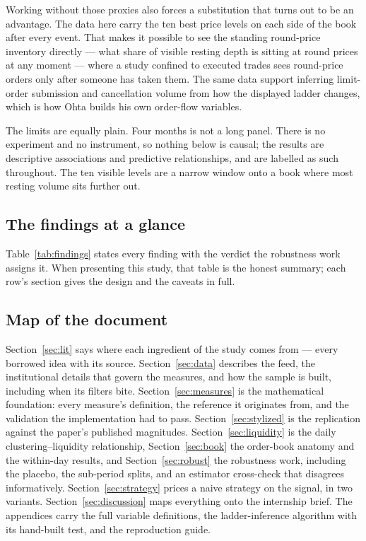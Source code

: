 Working without those proxies also forces a substitution that turns out to be an
advantage. The data here carry the ten best price levels on each side of the book
after every event. That makes it possible to see the standing round-price
inventory directly --- what share of visible resting depth is sitting at round
prices at any moment --- where a study confined to executed trades sees
round-price orders only after someone has taken them. The same data support
inferring limit-order submission and cancellation volume from how the displayed
ladder changes, which is how Ohta builds his own order-flow variables.

The limits are equally plain. Four months is not a long panel. There is no
experiment and no instrument, so nothing below is causal; the results are
descriptive associations and predictive relationships, and are labelled as such
throughout. The ten visible levels are a narrow window onto a book where most
resting volume sits further out.

\subsection{The findings at a glance}

Table~\ref{tab:findings} states every finding with the verdict the robustness
work assigns it. When presenting this study, that table is the honest summary;
each row's section gives the design and the caveats in full.



\subsection{Map of the document}

Section~\ref{sec:lit} says where each ingredient of the study comes from ---
every borrowed idea with its source. Section~\ref{sec:data} describes the feed,
the institutional details that govern the measures, and how the sample is
built, including when its filters bite. Section~\ref{sec:measures} is the
mathematical foundation: every measure's definition, the reference it
originates from, and the validation the implementation had to pass.
Section~\ref{sec:stylized} is the replication against the paper's published
magnitudes. Section~\ref{sec:liquidity} is the daily clustering--liquidity
relationship, Section~\ref{sec:book} the order-book anatomy and the within-day
results, and Section~\ref{sec:robust} the robustness work, including the
placebo, the sub-period splits, and an estimator cross-check that disagrees
informatively. Section~\ref{sec:strategy} prices a naive strategy on the
signal, in two variants. Section~\ref{sec:discussion} maps everything onto the
internship brief. The appendices carry the full variable definitions, the
ladder-inference algorithm with its hand-built test, and the reproduction
guide.
